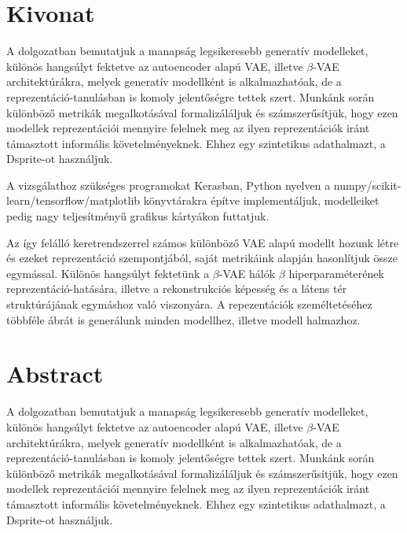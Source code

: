 \chapter*{Kivonat}

A dolgozatban bemutatjuk a manapság legsikeresebb generatív modelleket, különös hangsúlyt fektetve az autoencoder alapú VAE, illetve $\beta$-VAE architektúrákra, melyek generatív modellként is alkalmazhatóak, de a reprezentáció-tanulásban is komoly jelentőségre tettek szert. Munkánk során különböző metrikák megalkotásával formalizáláljuk és számszerűsítjük, hogy ezen modellek reprezentációi mennyire felelnek meg az ilyen reprezentációk iránt támasztott informális követelményeknek. Ehhez egy szintetikus adathalmazt, a Dsprite-ot használjuk.

A vizsgálathoz szükséges programokat Kerasban, Python nyelven a numpy/scikit-learn/tensorflow/matplotlib könyvtárakra építve implementáljuk, modelleiket pedig nagy teljesítményű grafikus kártyákon futtatjuk. 

Az így felálló keretrendszerrel számos különböző VAE alapú modellt hozunk létre és ezeket reprezentáció szempontjából, saját metrikáink alapján hasonlítjuk össze egymással. Különös hangsúlyt fektetünk a $\beta$-VAE hálók $\beta$ hiperparaméterének reprezentáció-hatására, illetve a rekonstrukciós képesség és a látens tér struktúrájának egymáshoz való viszonyára. A repezentációk személtetéséhez többféle ábrát is generálunk minden modellhez, illetve modell halmazhoz.

\vfill

\chapter*{Abstract}

A dolgozatban bemutatjuk a manapság legsikeresebb generatív modelleket, különös hangsúlyt fektetve az autoencoder alapú VAE, illetve $\beta$-VAE architektúrákra, melyek generatív modellként is alkalmazhatóak, de a reprezentáció-tanulásban is komoly jelentőségre tettek szert. Munkánk során különböző metrikák megalkotásával formalizáláljuk és számszerűsítjük, hogy ezen modellek reprezentációi mennyire felelnek meg az ilyen reprezentációk iránt támasztott informális követelményeknek. Ehhez egy szintetikus adathalmazt, a Dsprite-ot használjuk.


